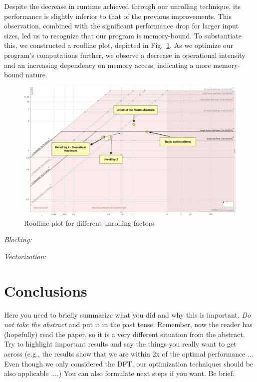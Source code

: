 \documentclass[letterpaper]{article}
\begin{document}
Despite the decrease in runtime achieved through our unrolling technique, its performance is slightly inferior to that of the previous improvements. This observation, combined with the significant performance drop for larger input sizes, led us to recognize that our program is memory-bound. To substantiate this, we constructed a roofline plot, depicted in Fig.~\ref{roofunroll}. As we optimize our program's computations further, we observe a decrease in operational intensity and an increasing dependency on memory access, indicating a more memory-bound nature.

\begin{figure}[htbp]
\centering
  \includegraphics[scale=0.25]{RooflineUnroll.pdf}
  \caption{Roofline plot for different unrolling factors\label{roofunroll}}
\end{figure}

\textit{Blocking:} 

\textit{Vectorization:} 

\section{Conclusions}

Here you need to briefly summarize what you did and why this is
important. {\em Do not take the abstract} and put it in the past
tense. Remember, now the reader has (hopefully) read the paper, so it
is a very different situation from the abstract. Try to highlight
important results and say the things you really want to get across
(e.g., the results show that we are within 2x of the optimal performance ...
Even though we only considered the DFT, our optimization
techniques should be also applicable ....) You can also formulate next
steps if you want. Be brief.
\end{document}

